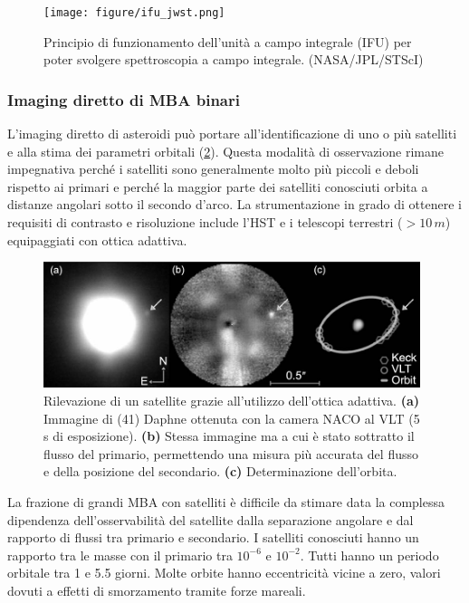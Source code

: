 \begin{figure}[!h]
    \centering
    \texttt{[image: figure/ifu\_jwst.png]}
    \caption[Principio di funzionamento dell'unità a campo integrale (IFU) per IFS.]{Principio di funzionamento dell'unità a campo integrale (IFU) per poter svolgere spettroscopia a campo integrale. (NASA/JPL/STScI)}
    \label{fig:ifu_jwst}
\end{figure}

\subsubsection{Imaging diretto di MBA binari}
L'imaging diretto di asteroidi può portare all'identificazione di uno o più satelliti e alla stima dei parametri orbitali (\cref{fig:binaries_direct_imaging}). Questa modalità di osservazione rimane impegnativa perché i satelliti sono generalmente molto più piccoli e deboli rispetto ai primari e perché la maggior parte dei satelliti conosciuti orbita a distanze angolari sotto il secondo d'arco. La strumentazione in grado di ottenere i requisiti di contrasto e risoluzione include l'HST e i telescopi terrestri ($>10\,m$) equipaggiati con ottica adattiva.

\begin{figure}[!h]
    \centering
    \includegraphics[width=0.98\textwidth]{figure/binaries_direct_imaging.jpg}
    \caption[Rilevazione del satellite di (41) Daphne grazie all'uso dell'ottica adattiva.]{Rilevazione di un satellite grazie all'utilizzo dell'ottica adattiva. \textbf{(a)} Immagine di (41) Daphne ottenuta con la camera NACO al VLT (5 s di esposizione). \textbf{(b)} Stessa immagine ma a cui è stato sottratto il flusso del primario, permettendo una misura più accurata del flusso e della posizione del secondario. \textbf{(c)} Determinazione dell'orbita. \citep{carry_ao_2009}}
    \label{fig:binaries_direct_imaging}
\end{figure}

La frazione di grandi MBA con satelliti è difficile da stimare data la complessa dipendenza dell'osservabilità del satellite dalla separazione angolare e dal rapporto di flussi tra primario e secondario. I satelliti conosciuti hanno un rapporto tra le masse con il primario tra $10^{-6}$ e $10^{-2}$. Tutti hanno un periodo orbitale tra 1 e 5.5 giorni. Molte orbite hanno eccentricità vicine a zero, valori dovuti a effetti di smorzamento tramite forze mareali.

